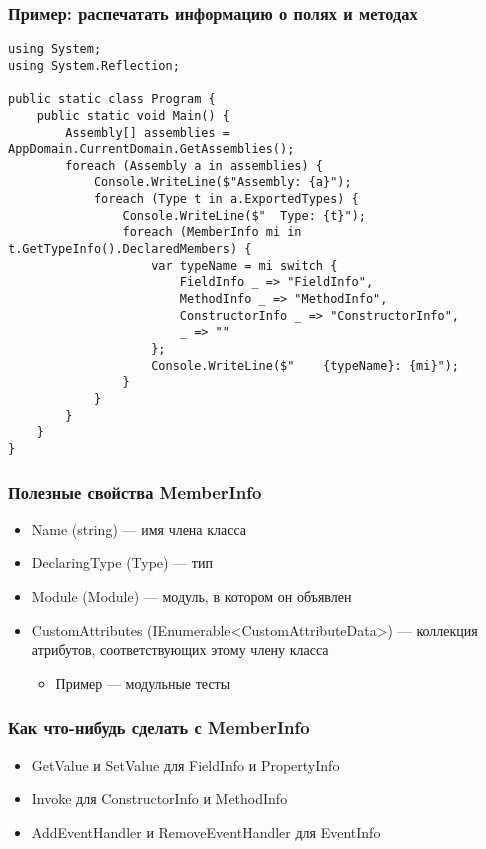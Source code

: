 \documentclass[xetex,mathserif,serif]{beamer}
\begin{document}
    \begin{frame}[fragile]
        \frametitle{Пример: распечатать информацию о полях и методах}
        \begin{scriptsize}
            \begin{verbatim}
using System;
using System.Reflection;

public static class Program {
    public static void Main() {
        Assembly[] assemblies = AppDomain.CurrentDomain.GetAssemblies();
        foreach (Assembly a in assemblies) {
            Console.WriteLine($"Assembly: {a}");
            foreach (Type t in a.ExportedTypes) {
                Console.WriteLine($"  Type: {t}");
                foreach (MemberInfo mi in t.GetTypeInfo().DeclaredMembers) {
                    var typeName = mi switch {
                        FieldInfo _ => "FieldInfo",
                        MethodInfo _ => "MethodInfo",
                        ConstructorInfo _ => "ConstructorInfo",
                        _ => ""
                    };
                    Console.WriteLine($"    {typeName}: {mi}");
                }
            }
        }
    }
}
            \end{verbatim}
        \end{scriptsize}
    \end{frame}

    \begin{frame}
        \frametitle{Полезные свойства MemberInfo}
        \begin{itemize}
            \item Name (string) --- имя члена класса
            \item DeclaringType (Type) --- тип
            \item Module (Module) --- модуль, в котором он объявлен
            \item CustomAttributes (IEnumerable<CustomAttributeData>) --- коллекция атрибутов, соответствующих этому члену класса
            \begin{itemize}
                \item Пример --- модульные тесты
            \end{itemize}
        \end{itemize}
    \end{frame}

    \begin{frame}
        \frametitle{Как что-нибудь сделать с MemberInfo}
        \begin{itemize}
            \item GetValue и SetValue для FieldInfo и PropertyInfo
            \item Invoke для ConstructorInfo и MethodInfo
            \item AddEventHandler и RemoveEventHandler для EventInfo
        \end{itemize}
    \end{frame}
\end{document}
